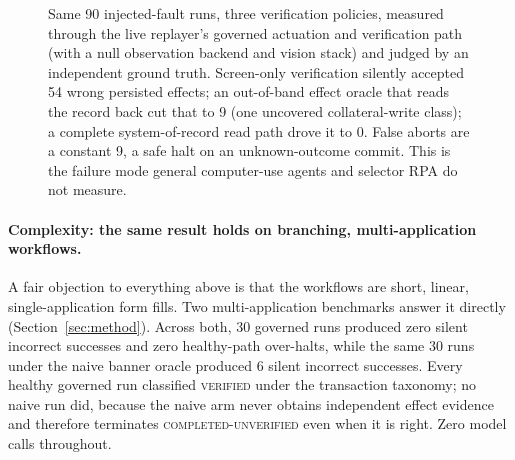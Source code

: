 \begin{figure}[t]
\centering
{}
\caption{Same 90 injected-fault runs, three verification policies, measured
through the live replayer's governed actuation and verification path (with a
null observation backend and vision stack) and judged by an independent ground
truth.
Screen-only verification silently accepted 54 wrong persisted effects; an
out-of-band effect oracle that reads the record back cut that to 9 (one
uncovered collateral-write class); a complete system-of-record read path drove it
to 0. False aborts are a constant 9, a safe halt on an unknown-outcome commit.
This is the failure mode general computer-use agents and selector RPA do not
measure.}
\label{fig:silentbar}
\end{figure}

\paragraph{Complexity: the same result holds on branching, multi-application
workflows.} A fair objection to everything above is that the workflows are
short, linear, single-application form fills. Two multi-application benchmarks
answer it directly (Section~\ref{sec:method}). Across both, 30 governed runs
produced zero silent incorrect successes and zero healthy-path over-halts, while
the same 30 runs under the naive banner oracle produced 6 silent incorrect
successes. Every healthy governed run classified \textsc{verified} under the
transaction taxonomy; no naive run did, because the naive arm never obtains
independent effect evidence and therefore terminates
\textsc{completed-unverified} even when it is right. Zero model calls throughout.

